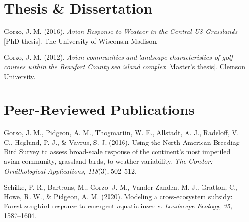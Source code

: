 \documentclass[11pt,a4paper,]{awesome-cv}
\begin{document}
\begin{cventries}
    \vspace{-4.0mm}
    \vspace{-4.0mm}
    \vspace{-4.0mm}
\end{cventries}

\hypertarget{thesis-dissertation}{%
\section{Thesis \& Dissertation}\label{thesis-dissertation}}

\hypertarget{bibliography}{}
\leavevmode{}%
Gorzo, J. M. (2016). \emph{Avian Response to Weather in the Central US
Grasslands} {[}PhD thesis{]}. The University of Wisconsin-Madison.

\leavevmode{}%
Gorzo, J. M. (2012). \emph{Avian communities and landscape
characteristics of golf courses within the Beaufort County sea island
complex} {[}Master's thesis{]}. Clemson University.

\hypertarget{peer-reviewed-publications}{%
\section{Peer-Reviewed Publications}\label{peer-reviewed-publications}}

\hypertarget{bibliography}{}
\leavevmode{}%
Gorzo, J. M., Pidgeon, A. M., Thogmartin, W. E., Allstadt, A. J.,
Radeloff, V. C., Heglund, P. J., \& Vavrus, S. J. (2016). Using the
North American Breeding Bird Survey to assess broad-scale response of
the continent's most imperiled avian community, grassland birds, to
weather variability. \emph{The Condor: Ornithological Applications},
\emph{118}(3), 502--512.

\leavevmode{}%
Schilke, P. R., Bartrons, M., Gorzo, J. M., Vander Zanden, M. J.,
Gratton, C., Howe, R. W., \& Pidgeon, A. M. (2020). Modeling a
cross-ecosystem subsidy: Forest songbird response to emergent aquatic
insects. \emph{Landscape Ecology}, \emph{35}, 1587--1604.
\end{document}
